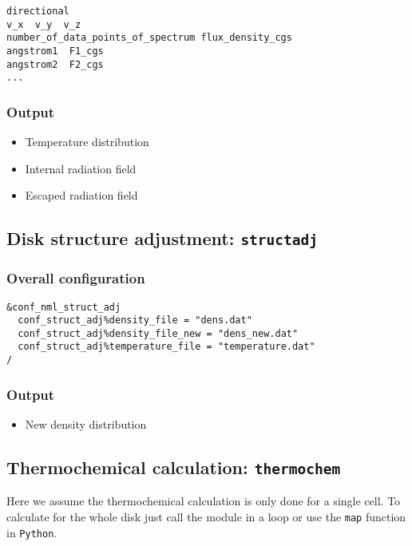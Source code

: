 \documentclass{article}
\newcommand{\cds}[1]{\texttt{#1}}
\newcommand{\python}{\texttt{Python}}
\newcommand{\structadj}{\texttt{structadj}}
\newcommand{\thermochem}{\texttt{thermochem}}
\begin{document}
\begin{lstlisting}
directional
v_x  v_y  v_z
number_of_data_points_of_spectrum flux_density_cgs
angstrom1  F1_cgs
angstrom2  F2_cgs
...
\end{lstlisting}

\subsubsection{Output}

\begin{itemize}
  \item Temperature distribution
  \item Internal radiation field
  \item Escaped radiation field
\end{itemize}  

\subsection{Disk structure adjustment: \structadj}

\subsubsection{Overall configuration}

\begin{lstlisting}
&conf_nml_struct_adj
  conf_struct_adj%density_file = "dens.dat"
  conf_struct_adj%density_file_new = "dens_new.dat"
  conf_struct_adj%temperature_file = "temperature.dat"
/
\end{lstlisting}

\subsubsection{Output}

\begin{itemize}
  \item New density distribution
\end{itemize}  

\subsection{Thermochemical calculation: \thermochem}

Here we assume the thermochemical calculation is only done for a single cell.  To calculate for the whole disk just call the module in a loop or use the \cds{map} function in \python.
\end{document}
